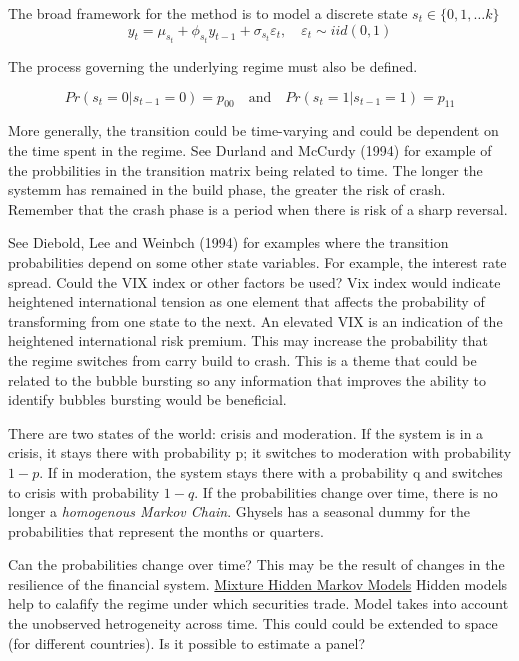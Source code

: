 \documentclass[12pt, a4paper, oneside]{article} %
\begin{document}
The broad framework for the method is to model a discrete state $s_t \in \{0,1,\dots k \}$
\begin{equation}
y_t = \mu_{s_t} + \phi_{s_t} y_{t-1} + \sigma_{s_t} \varepsilon_t, \quad \varepsilon_t \sim iid(0,1) 
\end{equation}

The process governing the underlying regime must also be defined. 

\begin{equation}
Pr(s_t = 0| s_{t-1} = 0) = p_{00} \quad \text{and} \quad Pr(s_t = 1| s_{t-1} = 1) = p_{11}
\end{equation}

More generally, the transition could be time-varying and could be dependent on the time spent in the regime.  See Durland and McCurdy (1994) for example of the probbilities  in the transition matrix being related to time. The longer the systemm has remained in the build phase, the greater the risk of crash.  Remember that the crash phase is a period when there is risk of a sharp reversal.  

See Diebold, Lee and Weinbch (1994) for examples where the transition probabilities depend on some other state variables.  For example, the interest rate spread.   Could the VIX index or other factors be used?  Vix index would indicate heightened international tension as one element that affects the probability of transforming from one state to the next.  An elevated VIX is an indication of the heightened international risk premium.  This may increase the probability that the regime switches from carry build to crash.  This is a theme that could be related to the bubble bursting so any information that improves the ability to identify bubbles bursting would be beneficial.  


  There are two states of the world:  crisis and moderation.  If the system is in a crisis, it stays there with probability p; it switches to moderation with probability $1-p$.  If in moderation, the system stays there with a probability q and switches to crisis with probability $1-q$.  If the probabilities change over time, there is no longer a \emph{homogenous Markov Chain}. Ghysels has a seasonal dummy for the probabilities that represent the months or quarters.  

Can the probabilities change over time?  This may be the result of changes in the resilience of the financial system. 
\href{http://members.home.nl/jeroenvermunt/dias2010.pdf}{Mixture Hidden Markov Models} Hidden models help to calafify the regime under which securities trade. Model takes into account the unobserved hetrogeneity across time. This could could be extended to space (for different countries).  Is it possible to estimate a panel? 
\end{document}
